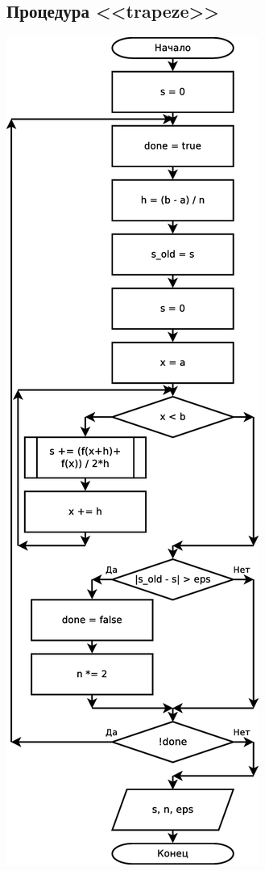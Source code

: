\documentclass[a4paper]{article}
\begin{document}
\subsection{Процедура <<trapeze>>}
\includegraphics[scale=0.35]{schemes/trapeze}
\end{document}
